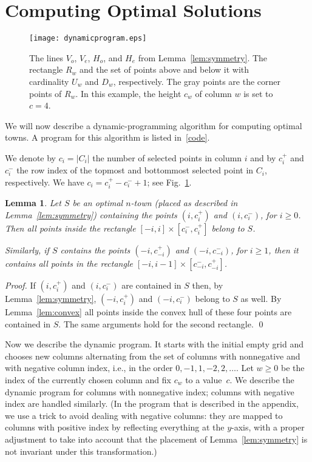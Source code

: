 \documentclass[preprint,authoryear,12pt]{elsarticle}
\newtheorem{lemma}[theorem]{Lemma}
\begin{document}
\section{Computing Optimal Solutions}\label{sec:optimal}
\begin{figure}[tb]
\begin{center}
\texttt{[image: dynamicprogram.eps]} \caption{The
lines $V_o$, $V_e$, $H_o$, and $H_e$ from Lemma~\ref{lem:symmetry}.
The rectangle $R_w$ and the set of points above and below it with
cardinality $U_w$ and $D_w$, respectively. The gray points are the
corner points of $R_w$. In this example, the height $c_w$ of column
$w$ is set to $c=4$.} \label{fig:dynamicprogram}
\end{center}
\end{figure}

We will now describe a dynamic-programming algorithm for computing
optimal towns. A program for this algorithm is listed
in~\ref{code}.

We denote by $c_i=|C_i|$ the number of selected points in column $i$
and by $c_i^+$ and $c_i^-$ the row index of the topmost and
bottommost selected point in $C_i$, respectively. We have $c_i =
c_i^+ - c_i^- +1$; see Fig.~\ref{fig:dynamicprogram}.


\begin{lemma}\label{lem:rectangle}
Let $S$ be an optimal $n$-town \textup(placed as described in
Lemma~\ref{lem:symmetry}\textup) containing the points $(i,c_{i}^+)$ and
$(i,c_{i}^-)$, for $i\geq 0$. Then all points inside the rectangle
$[-i,i]\times[c_{i}^-, c_{i}^+]$ belong to $S$.

Similarly, if $S$ contains
the points $(-i,c_{-i}^+)$ and $(-i,c_{-i}^-)$, for $i\geq1$, then it contains all
points in the rectangle
$[-i,i-1]\times[c_{-i}^-, c_{-i}^+]$.
\end{lemma}
\begin{proof}
If $(i,c_{i}^+)$ and $(i,c_{i}^-)$ are contained in $S$ then, by
Lemma~\ref{lem:symmetry}, $(-i,c_{i}^+)$ and $(-i,c_{i}^-)$ belong
to $S$ as well. By Lemma~\ref{lem:convex} all points inside the
convex hull of these four points are contained in $S$. The same
arguments hold for the second rectangle.  \qed
\end{proof}

Now we describe the dynamic program. It starts with the initial
empty grid and chooses new columns alternating from the set of
columns with nonnegative and with negative column index, i.e.,
in the order
$0,-1,1,-2,2,\ldots$. Let $w \geq 0$ be the index of the currently
chosen column and fix $c_w$ to a value~$c$. We describe the dynamic
program for columns with nonnegative index; columns with negative
index are handled similarly.
(In the program that is described in the appendix, we use a trick to
avoid dealing with negative columns: they are mapped to columns with positive
index by reflecting everything at the $y$-axis, with a proper
adjustment to take into account that the placement of
Lemma~\ref{lem:symmetry} is not invariant under this transformation.)
\end{document}

